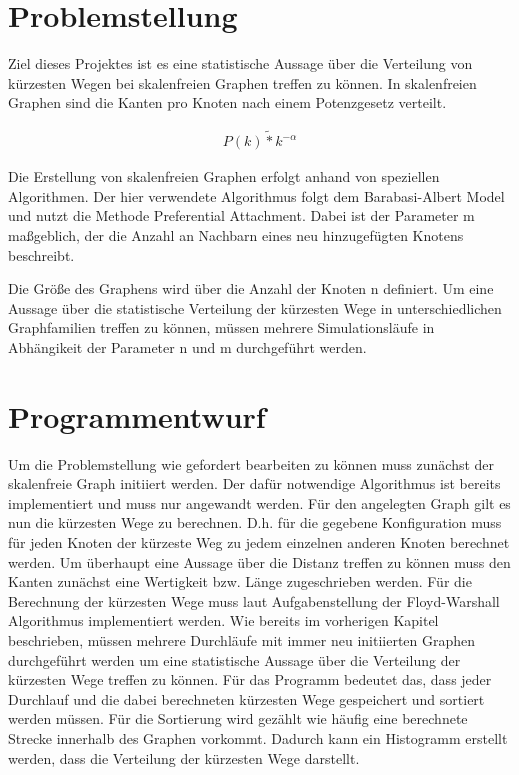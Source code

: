 \documentclass[10pt]{article}
\begin{document}
\lstset{
	language=C,
	basicstyle=\footnotesize,
	frame=tb,
	xleftmargin=.2\textwidth,
	xrightmargin=.2\textwidth
}
\onehalfspacing

\tableofcontents
\newpage
\section{Problemstellung}

Ziel dieses Projektes ist es eine statistische Aussage über die Verteilung von kürzesten Wegen bei skalenfreien Graphen treffen zu können. In skalenfreien Graphen sind die Kanten pro Knoten nach einem Potenzgesetz verteilt. 

\begin{align*}
P(k) \tilde{*} k^{-\alpha}
\end{align*}

Die Erstellung von skalenfreien Graphen erfolgt anhand von speziellen Algorithmen. Der hier verwendete Algorithmus folgt dem Barabasi-Albert Model und nutzt die Methode Preferential Attachment. Dabei ist der Parameter m maßgeblich, der die Anzahl an Nachbarn eines neu hinzugefügten Knotens beschreibt. 

Die Größe des Graphens wird über die Anzahl der Knoten n definiert. Um eine Aussage über die statistische Verteilung der kürzesten Wege in unterschiedlichen Graphfamilien treffen zu können, müssen mehrere Simulationsläufe in Abhängikeit der Parameter n und m durchgeführt werden.

\section{Programmentwurf}

Um die Problemstellung wie gefordert bearbeiten zu können muss zunächst der skalenfreie Graph initiiert werden. Der dafür notwendige Algorithmus ist bereits implementiert und muss nur angewandt werden. Für den angelegten Graph gilt es nun die kürzesten Wege zu berechnen. D.h. für die gegebene Konfiguration muss für jeden Knoten der kürzeste Weg zu jedem einzelnen anderen Knoten berechnet werden. %
Um überhaupt eine Aussage über die Distanz treffen zu können muss den Kanten zunächst eine Wertigkeit bzw. Länge zugeschrieben werden. Für die Berechnung der kürzesten Wege muss laut Aufgabenstellung der Floyd-Warshall Algorithmus implementiert werden. 
Wie bereits im vorherigen Kapitel beschrieben, müssen mehrere Durchläufe mit immer neu initiierten Graphen durchgeführt werden um eine statistische Aussage über die Verteilung der kürzesten Wege treffen zu können. Für das Programm bedeutet das, dass jeder Durchlauf und die dabei berechneten kürzesten Wege gespeichert und sortiert werden müssen. Für die Sortierung wird gezählt wie häufig eine berechnete Strecke innerhalb des Graphen vorkommt.
Dadurch kann ein Histogramm erstellt werden, dass die Verteilung der kürzesten Wege darstellt.
\end{document}

